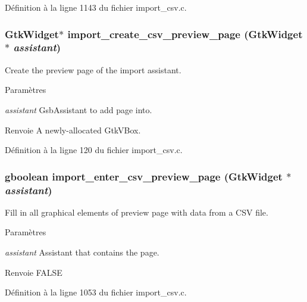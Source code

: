 Définition à la ligne 1143 du fichier import\_\-csv.c.

\subsubsection[{import\_\-create\_\-csv\_\-preview\_\-page}]{\setlength{\rightskip}{0pt plus 5cm}GtkWidget$\ast$ import\_\-create\_\-csv\_\-preview\_\-page (GtkWidget $\ast$ {\em assistant})}\label{import__csv_8h_a4539af86cc658258c77621c5e2473d29}
Create the preview page of the import assistant.


\begin{DoxyParams}{Paramètres}
\item[{\em assistant}]GsbAssistant to add page into.\end{DoxyParams}
\begin{DoxyReturn}{Renvoie}
A newly-\/allocated GtkVBox. 
\end{DoxyReturn}


Définition à la ligne 120 du fichier import\_\-csv.c.

\subsubsection[{import\_\-enter\_\-csv\_\-preview\_\-page}]{\setlength{\rightskip}{0pt plus 5cm}gboolean import\_\-enter\_\-csv\_\-preview\_\-page (GtkWidget $\ast$ {\em assistant})}\label{import__csv_8h_afa61668796ba48ba9a3df231034349ca}
Fill in all graphical elements of preview page with data from a CSV file.


\begin{DoxyParams}{Paramètres}
\item[{\em assistant}]Assistant that contains the page.\end{DoxyParams}
\begin{DoxyReturn}{Renvoie}
FALSE 
\end{DoxyReturn}


Définition à la ligne 1053 du fichier import\_\-csv.c.

